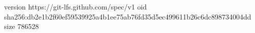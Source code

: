 version https://git-lfs.github.com/spec/v1
oid sha256:db2e1b2f60ef59539925a4b1ee75ab76fd35d5ec499611b26c6dc898734004dd
size 786528
